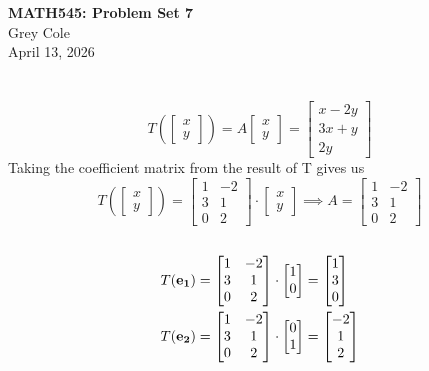 \documentclass[]{article}
\newcommand{\bmat}[1]{\begin{bmatrix}#1\end{bmatrix}}
\begin{document}
	\begin{center}
		{\Large\textbf{MATH545: Problem Set 7}}\\
		\large Grey Cole\\
		April 13, 2026
	\end{center}
\section{}
\subsection{}
\[ T\left(\bmat{x\\y}\right) = A\bmat{x\\y} = \bmat{x-2y\\3x+y\\2y}\]
Taking the coefficient matrix from the result of T gives us
\[ T\left(\bmat{x\\y}\right) = \bmat{1 & -2\\3 & 1\\0 & 2} \cdot \bmat{x\\y} \implies \boxed{A = \bmat{1 & -2\\3 & 1\\0 & 2}}\]
\subsection{}
\begin{align*}
	T(\bf{e}_1) &= \bmat{1 & -2\\3 & 1\\0 & 2} \cdot \bmat{1 \\ 0} = \bmat{1 \\ 3 \\ 0}\\
	T(\bf{e}_2) &= \bmat{1 & -2\\3 & 1\\0 & 2} \cdot \bmat{0 \\ 1} = \bmat{-2 \\ 1 \\ 2}
\end{align*}
\end{document}

